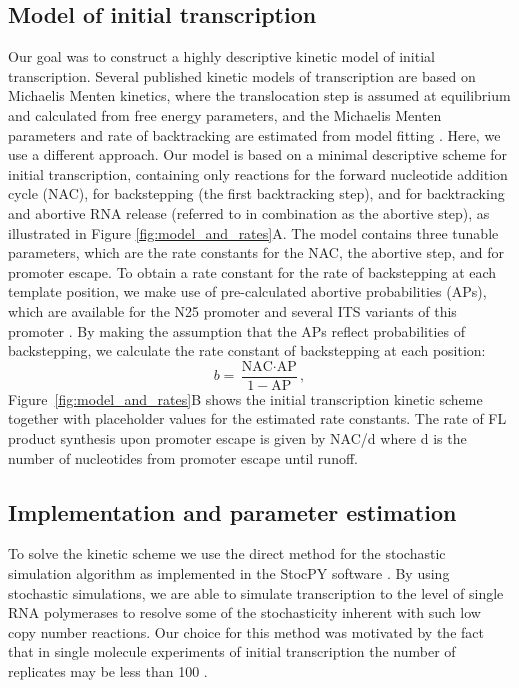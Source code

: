 %
\subsection{Model of initial transcription}
Our goal was to construct a highly descriptive kinetic model of initial
transcription. Several published kinetic models of transcription are based on Michaelis
Menten kinetics, where the translocation step is assumed at equilibrium and
calculated from free energy parameters, and the Michaelis Menten parameters
and rate of backtracking are estimated from model fitting
\cite{guajardo_model_1997, bai_sequence-dependent_2004,
bai_mechanochemical_2007, tadigotla_thermodynamic_2006}. Here, we use a
different approach. Our model is based on a minimal descriptive scheme for initial
transcription, containing only reactions for the forward nucleotide addition
cycle (NAC), for backstepping (the first backtracking step), and for
backtracking and abortive RNA release (referred to in combination as the
abortive step), as illustrated in Figure \ref{fig:model_and_rates}A. The model contains
three tunable parameters, which are the rate constants for the NAC, the
abortive step, and for promoter escape. To obtain a rate constant for the rate
of backstepping at each template position, we make use of pre-calculated
abortive probabilities\cite{hsu_quantitative_1996} (APs), which are available
for the N25 promoter and several ITS variants of this promoter
\cite{hsu_initial_2006}. By making the assumption that the APs reflect
probabilities of backstepping, we calculate the rate constant of backstepping
at each position:
\begin{equation*}
  b = \frac{\text{NAC}\cdot \text{AP}}{1-\text{AP}},
\end{equation*}
Figure~\ref{fig:model_and_rates}B shows the initial transcription kinetic scheme
together with placeholder values for the estimated rate constants.
The rate of FL product synthesis upon promoter escape is given by NAC/d
where d is the number of nucleotides from promoter escape until runoff.

\subsection{Implementation and parameter estimation}
To solve the kinetic scheme we use the direct method for the stochastic
simulation algorithm \cite{gillespie_exact_1977} as implemented in the StocPY
software \cite{maarleveld_stochpy:_2013}. By using stochastic simulations, we
are able to simulate transcription to the level of single RNA polymerases to
resolve some of the stochasticity inherent with such low copy number
reactions. Our choice for this method was motivated by the fact that in single
molecule experiments of initial transcription the number of replicates may be
less than 100 \cite{revyakin_abortive_2006}.

